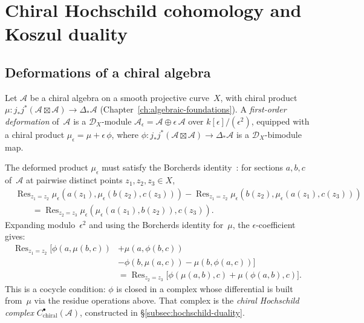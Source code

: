 \chapter{Chiral Hochschild cohomology and Koszul duality}
\label{chap:deformation-theory}


\section{Deformations of a chiral algebra}

Let $\mathcal{A}$ be a chiral algebra on a smooth projective curve~$X$,
with chiral product
$\mu\colon j_*j^*(\mathcal{A}\boxtimes\mathcal{A})\to\Delta_*\mathcal{A}$
(Chapter~\ref{ch:algebraic-foundations}).
A \emph{first-order deformation} of~$\mathcal{A}$ is a
$\mathcal{D}_X$-module
$\mathcal{A}_\epsilon = \mathcal{A}\oplus\epsilon\,\mathcal{A}$
over $k[\epsilon]/(\epsilon^2)$, equipped with a chiral product
$\mu_\epsilon = \mu + \epsilon\,\phi$, where
$\phi\colon j_*j^*(\mathcal{A}\boxtimes\mathcal{A})\to\Delta_*\mathcal{A}$
is a $\mathcal{D}_X$-bimodule map.

The deformed product $\mu_\epsilon$ must satisfy the Borcherds
identity~\cite{Bor92,BD04}:
for sections $a,b,c$ of~$\mathcal{A}$ at pairwise distinct points
$z_1,z_2,z_3\in X$,
\[
\begin{aligned}
  &\operatorname{Res}_{z_1\!=z_2}\!\mu_\epsilon(a(z_1),\mu_\epsilon(b(z_2),c(z_3)))
  - \operatorname{Res}_{z_1\!=z_2}\!\mu_\epsilon(b(z_2),\mu_\epsilon(a(z_1),c(z_3)))\\
  &\qquad= \operatorname{Res}_{z_2\!=z_3}\!\mu_\epsilon(\mu_\epsilon(a(z_1),b(z_2)),c(z_3)).
\end{aligned}
\]
Expanding modulo~$\epsilon^2$ and using the Borcherds identity for~$\mu$,
the $\epsilon$-coefficient gives:
\begin{equation}\label{eq:deformation-cocycle}
\begin{split}
  \operatorname{Res}_{z_1\!=z_2}\!\bigl[\phi(a,\mu(b,c))
  &+ \mu(a,\phi(b,c))\\
  &- \phi(b,\mu(a,c))
  - \mu(b,\phi(a,c))\bigr]\\
  &= \operatorname{Res}_{z_2\!=z_3}\!\bigl[\phi(\mu(a,b),c)
  + \mu(\phi(a,b),c)\bigr].
\end{split}
\end{equation}
This is a cocycle condition: $\phi$ is closed in a complex whose
differential is built from~$\mu$ via the residue operations above.
That complex is the \emph{chiral Hochschild complex}
$C^{\bullet}_{\mathrm{chiral}}(\mathcal{A})$, constructed in
\S\ref{subsec:hochschild-duality}.

